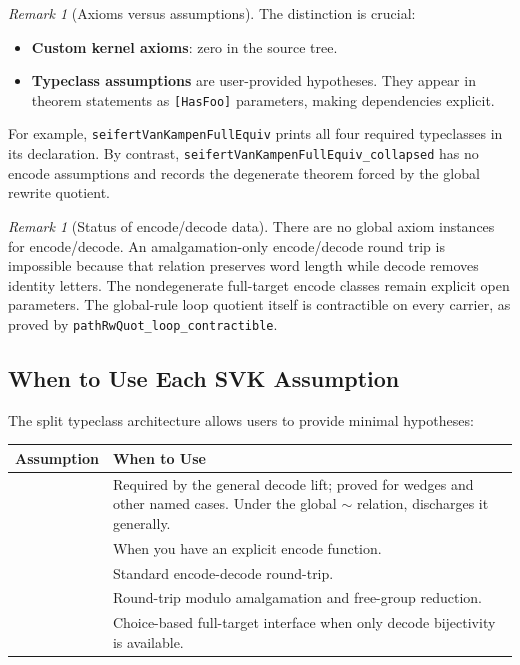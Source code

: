 \documentclass{lmcs}
\theoremstyle{definition}
\theoremstyle{plain}
\theoremstyle{remark}
\newtheorem{remark}[definition]{Remark}
\newcommand{\RwEq}{\sim}
\begin{document}
\begin{remark}[Axioms versus assumptions]
The distinction is crucial:
\begin{itemize}
    \item \textbf{Custom kernel axioms}: zero in the source tree.
    \item \textbf{Typeclass assumptions} are user-provided hypotheses. They appear in theorem statements as \texttt{[HasFoo]} parameters, making dependencies explicit.
\end{itemize}
For example, \texttt{seifertVanKampenFullEquiv} prints all four required
typeclasses in its declaration.  By contrast,
\texttt{seifertVanKampenFullEquiv\_collapsed} has no encode assumptions and
records the degenerate theorem forced by the global rewrite quotient.
\end{remark}

\begin{remark}[Status of encode/decode data]
\label{rem:encode-decode-consistency}
There are no global axiom instances for encode/decode.  An
amalgamation-only encode/decode round trip is impossible because that relation
preserves word length while decode removes identity letters.
The nondegenerate full-target encode classes remain explicit open parameters.
The global-rule loop quotient itself is contractible on every carrier, as
proved by \texttt{pathRwQuot\_loop\_contractible}.
\end{remark}

\subsection{When to Use Each SVK Assumption}

The split typeclass architecture allows users to provide minimal hypotheses:

\begin{center}
\setlength{\tabcolsep}{4pt}
\footnotesize
\begin{tabular}{@{}L{0.42\textwidth}L{0.50\textwidth}@{}}
\toprule
\textbf{Assumption} & \textbf{When to Use} \\
\midrule
{} & Required by the general decode lift;
proved for wedges and other named cases.  Under the global \(\RwEq\) relation,
 discharges it generally. \\
 & When you have an explicit encode function. \\
 & Standard encode-decode round-trip. \\
 & Round-trip modulo amalgamation and
free-group reduction. \\
 & Choice-based full-target
interface when only decode bijectivity is available. \\
\bottomrule
\end{tabular}
\end{center}
\end{document}
